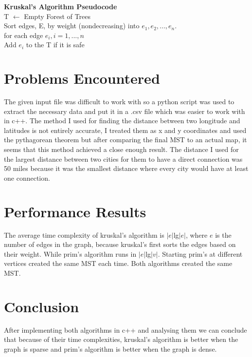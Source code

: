 \documentclass[a4paper]{article}
\begin{document}
    \textbf{Kruskal's Algorithm Pseudocode} \\
    T $\leftarrow$ Empty Forest of Trees \\
    Sort edges, E, by weight (nondecreasing) into $e_{1}, e_{2}, ..., e_{n}$. \\
    for each edge $e_{i}, i=1,...,n$ \\
    \phantom{hell}Add $e_{i}$ to the T if it is safe \\


    \section{Problems Encountered}
    The given input file was difficult to work with so a python script was used to 
    extract the necessary data and put it in a .csv file which was easier to work with
    in c++. The method I used for finding the distance between two longitude and latitudes
    is not entirely accurate, I treated them as x and y coordinates and used the
    pythagorean theorem but after comparing the final MST to an actual map, it seems 
    that this method achieved a close enough result. The distance I used for the 
    largest distance between two cities for them to have a direct connection was 50
    miles because it was the smallest distance where every city would have at least
    one connection.


    \section{Performance Results}
    The average time complexity of kruskal's algorithm is $|e|$lg$|e|$, where $e$ is 
    the number of edges in the graph, because kruskal's first sorts the edges based
    on their weight. While prim's algorithm runs in $|e|$lg$|v|$. Starting prim's 
    at different vertices created the same MST each time. Both algorithms created the
    same MST.

    \section{Conclusion}
    After implementing both algorithms in c++ and analysing them we can conclude that
    because of their time complexities, kruskal's algorithm is better when the graph 
    is sparse and prim's algorithm is better when the graph is dense. 
\end{document}
